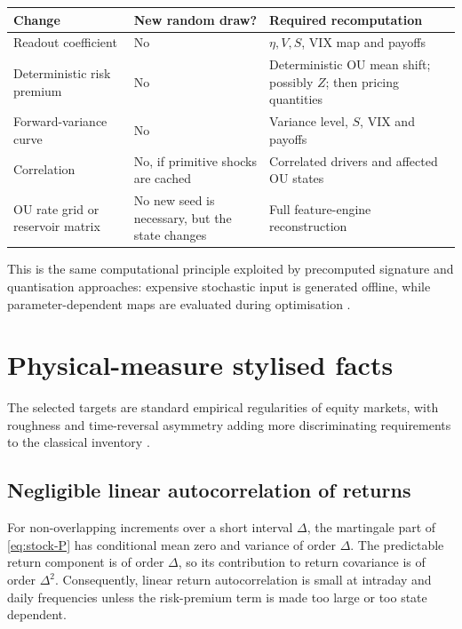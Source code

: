 \documentclass[11pt,a4paper]{article}
\begin{document}
\begin{center}
\begin{tabularx}{\textwidth}{@{}Y C{28mm} Y@{}}
\toprule
\textbf{Change} & \textbf{New random draw?} & \textbf{Required recomputation} \\
\midrule
Readout coefficient & No & \(\eta,V,S\), VIX map and payoffs \\
Deterministic risk premium & No & Deterministic OU mean shift; possibly \(Z\); then pricing quantities \\
Forward-variance curve & No & Variance level, \(S\), VIX and payoffs \\
Correlation & No, if primitive shocks are cached & Correlated drivers and affected OU states \\
OU rate grid or reservoir matrix & No new seed is necessary, but the state changes & Full feature-engine reconstruction \\
\bottomrule
\end{tabularx}
\end{center}

This is the same computational principle exploited by precomputed signature and quantisation
approaches: expensive stochastic input is generated offline, while parameter-dependent maps
are evaluated during optimisation \cite{cuchiero2024,abijaber2024}.

\section{Physical-measure stylised facts}

The selected targets are standard empirical regularities of equity markets, with roughness and
time-reversal asymmetry adding more discriminating requirements to the classical inventory
\cite{cont2001,gatheral2018,zumbach2009}.

\subsection{Negligible linear autocorrelation of returns}

For non-overlapping increments over a short interval \(\Delta\), the martingale part of
\cref{eq:stock-P} has conditional mean zero and variance of order \(\Delta\). The predictable
return component is of order \(\Delta\), so its contribution to return covariance is of order
\(\Delta^2\). Consequently, linear return autocorrelation is small at intraday and daily
frequencies unless the risk-premium term is made too large or too state dependent.
\end{document}

